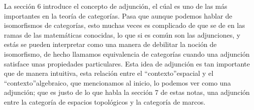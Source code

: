 \documentclass{comunicaciones}
\begin{document}
La sección 6 introduce el concepto de adjunción, el cúal es uno de las más importantes en la teoría de categorías. Pasa que aunque podemos hablar de isomorfismos de categorías, esto muchas veces es complicado de que se de en las ramas de las matemáticas conocidas, lo que si es común son las adjunciones, y estás se pueden interpretar como una manera de debilitar la noción de isomorfismo, de hecho llamamos equivalencia de categorías cuando una adjunción satisface unas propiedades particulares. Esta idea de adjunción es tan importante que de manera intuitiva, esta relación entre el \textquotedblleft contexto\textquotedblright  espacial y el \textquotedblleft contexto\textquotedblright  algebraico, que mencionamos al inicio, lo podemos ver como una adjunción; que es justo de lo que habla la sección 7 de estas notas, una adjunción entre la categoría de espacios topológicos y la categoría de marcos. 

\newpage
\tableofcontents

\newpage
\end{document}
